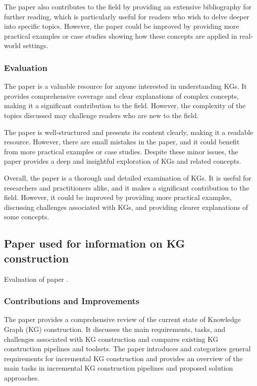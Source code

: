 \documentclass[11pt]{article} %
\begin{document}
The paper also contributes to the field by providing an extensive bibliography for further reading, which is particularly useful for readers who wish to delve deeper into specific topics. However, the paper could be improved by providing more practical examples or case studies showing how these concepts are applied in real-world settings. 

\subsubsection*{Evaluation}

The paper is a valuable resource for anyone interested in understanding KGs. It provides comprehensive coverage and clear explanations of complex concepts, making it a significant contribution to the field. However, the complexity of the topics discussed may challenge readers who are new to the field. 

The paper is well-structured and presents its content clearly, making it a readable resource. However, there are small mistakes in the paper, and it could benefit from more practical examples or case studies. Despite these minor issues, the paper provides a deep and insightful exploration of KGs and related concepts. 

Overall, the paper is a thorough and detailed examination of KGs. It is useful for researchers and practitioners alike, and it makes a significant contribution to the field. However, it could be improved by providing more practical examples, discussing challenges associated with KGs, and providing clearer explanations of some concepts.


\subsection{Paper used for information on KG construction}
Evaluation of paper .

\subsubsection*{Contributions and Improvements}

The paper provides a comprehensive review of the current state of Knowledge Graph (KG) construction. It discusses the main requirements, tasks, and challenges associated with KG construction and compares existing KG construction pipelines and toolsets. The paper introduces and categorizes general requirements for incremental KG construction and provides an overview of the main tasks in incremental KG construction pipelines and proposed solution approaches. 
\end{document}

